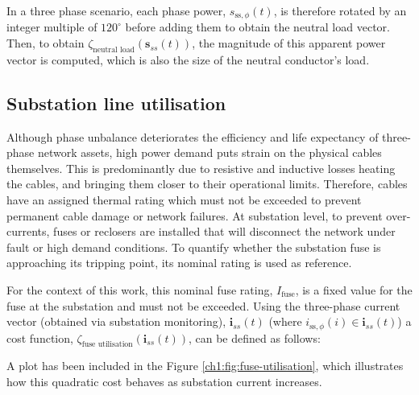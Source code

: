 In a three phase scenario, each phase power, $s_{\text{ss},\phi}(t)$, is therefore rotated by an integer multiple of $120^\circ$ before adding them to obtain the neutral load vector.
Then, to obtain $\zeta_\text{neutral load}(\textbf{s}_{ss}(t))$, the magnitude of this apparent power vector is computed, which is also the size of the neutral conductor's load.

\subsection{Substation line utilisation}
\label{ch1:subsec:substation-line-utilisation}

Although phase unbalance deteriorates the efficiency and life expectancy of three-phase network assets, high power demand puts strain on the physical cables themselves.
This is predominantly due to resistive and inductive losses heating the cables, and bringing them closer to their operational limits.
Therefore, cables have an assigned thermal rating which must not be exceeded to prevent permanent cable damage or network failures.
At substation level, to prevent over-currents, fuses or reclosers are installed that will disconnect the network under fault or high demand conditions.
To quantify whether the substation fuse is approaching its tripping point, its nominal rating is used as reference.


For the context of this work, this nominal fuse rating, $I_\text{fuse}$, is a fixed value for the fuse at the substation and must not be exceeded.
Using the three-phase current vector (obtained via substation monitoring), $\textbf{i}_{ss}(t)$ (where $i_{\text{ss},\phi}(i) \in \textbf{i}_{ss}(t)$) a cost function, $\zeta_\text{fuse utilisation}(\textbf{i}_{ss}(t))$, can be defined as follows:



A plot has been included in the Figure \ref{ch1:fig:fuse-utilisation}, which illustrates how this quadratic cost behaves as substation current increases.

